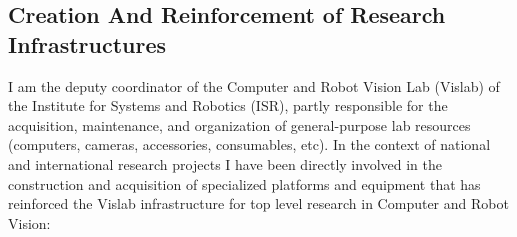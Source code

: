\subsection{Creation And Reinforcement of Research
Infrastructures}\label{creation-and-reinforcement-of-research-infrastructures}

I am the deputy coordinator of the Computer and Robot Vision Lab
(Vislab) of the Institute for Systems and Robotics (ISR), partly
responsible for the acquisition, maintenance, and organization of
general-purpose lab resources (computers, cameras, accessories,
consumables, etc). In the context of national and international research
projects I have been directly involved in the construction and
acquisition of specialized platforms and equipment that has reinforced
the Vislab infrastructure for top level research in Computer and Robot
Vision:

